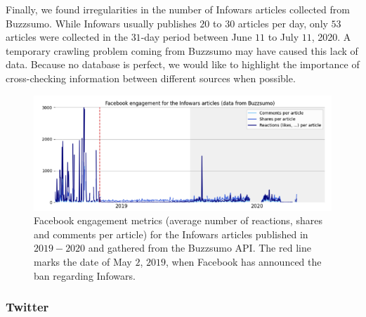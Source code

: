 \documentclass{article}
\begin{document}
\smallskip

{\color{pink} Finally, we found irregularities in the number of Infowars articles collected from Buzzsumo. While Infowars usually publishes $20$ to $30$ articles per day, only $53$ articles were collected in the $31$-day period between June $11$ to July $11$, 2020. A temporary crawling problem coming from Buzzsumo may have caused this lack of data. Because no database is perfect, we would like to highlight the importance of cross-checking information between different sources when possible.}


\begin{figure}
	\centering
	
	\begin{multicols}{1}
		\includegraphics[scale=0.35]{./img/infowars/fb_infowars_3.png}
	\end{multicols}

	\caption{Facebook engagement metrics (average number of reactions, shares and comments per article) for the Infowars articles published in $2019-2020$ and gathered from the Buzzsumo API. The red line marks the date of May $2$, $2019$, when Facebook has announced the ban regarding Infowars.}
	\label{infowars2}
\end{figure}


\subsubsection{Twitter} 
\end{document}
